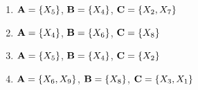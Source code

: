 \documentclass[11pt]{article}
\begin{document}
{\begin{enumerate}
\begin{enumerate}[label=(\alph*)]
\begin{answertext}{2cm}{}
\end{answertext}
\item ${\bf A} = \{ X_5 \}$, ${\bf B} = \{X_4\}$, ${\bf C} = \{X_2,X_7\}$

\begin{answertext}{2cm}{}
\end{answertext}
\item ${\bf A} = \{X_4\}$, ${\bf B} = \{X_6\}$, ${\bf C} = \{X_8\}$

\begin{answertext}{2cm}{}
\end{answertext}
\item ${\bf A} = \{X_5\}$, ${\bf B} = \{X_4\}$, ${\bf C} = \{X_2\}$

\begin{answertext}{2cm}{}
\end{answertext}
\item ${\bf A} = \{X_6, X_9\}$, ${\bf B} = \{X_8\}$, ${\bf C} = \{X_3,X_1\}$

\begin{answertext}{2cm}{}
\end{answertext}
\end{enumerate}
\end{enumerate}

}
\end{document}

